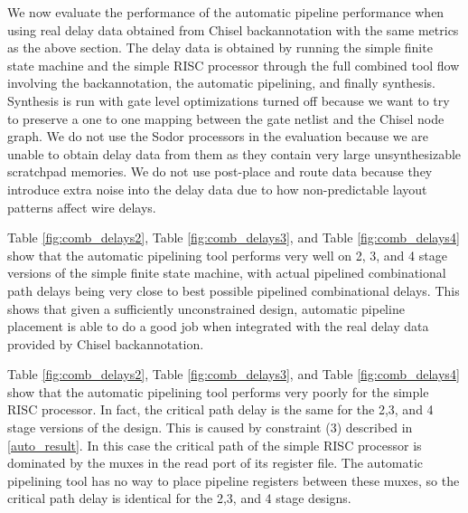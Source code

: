 We now evaluate the performance of the automatic pipeline performance when using real delay data obtained from Chisel backannotation with the same metrics as the above section. The delay data is obtained by running the simple finite state machine and the simple RISC processor through the full combined tool flow involving the backannotation, the automatic pipelining, and finally synthesis. Synthesis is run with gate level optimizations turned off because we want to try to preserve a one to one mapping between the gate netlist and the Chisel node graph. We do not use the Sodor processors in the evaluation because we are unable to obtain delay data from them as they contain very large unsynthesizable scratchpad memories. We do not use post-place and route data because they introduce extra noise into the delay data due to how non-predictable layout patterns affect wire delays.

Table \ref{fig:comb_delays2}, Table \ref{fig:comb_delays3}, and Table \ref{fig:comb_delays4} show that the automatic pipelining tool performs very well on 2, 3, and 4 stage versions of the simple finite state machine, with actual pipelined combinational path delays being very close to best possible pipelined combinational delays.  This shows that given a sufficiently unconstrained design, automatic pipeline placement is able to do a good job when integrated with the real delay data provided by Chisel backannotation.

Table \ref{fig:comb_delays2}, Table \ref{fig:comb_delays3}, and Table \ref{fig:comb_delays4} show that the automatic pipelining tool performs very poorly for the simple RISC processor. In fact, the critical path delay is the same for the 2,3, and 4 stage versions of the design. This is caused by constraint (3) described in \ref{auto_result}. In this case the critical path of the simple RISC processor is dominated by the muxes in the read port of its register file. The automatic pipelining tool has no way to place pipeline registers between these muxes, so the critical path delay is identical for the 2,3, and 4 stage designs.

